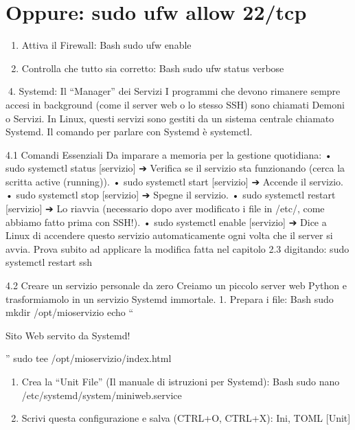 \documentclass[11pt,a4paper]{article}
\begin{document}
\section{Oppure: sudo ufw allow
22/tcp}\label{oppure-sudo-ufw-allow-22tcp}

\begin{enumerate}
\def\labelenumi{\arabic{enumi}.}
\setcounter{enumi}{2}
\item
  Attiva il Firewall: Bash sudo ufw enable
\item
  Controlla che tutto sia corretto: Bash sudo ufw status verbose
\end{enumerate}

4. Systemd: Il ``Manager'' dei Servizi I programmi che devono rimanere
sempre accesi in background (come il server web o lo stesso SSH) sono
chiamati Demoni o Servizi. In Linux, questi servizi sono gestiti da un
sistema centrale chiamato Systemd. Il comando per parlare con Systemd è
systemctl.

4.1 Comandi Essenziali Da imparare a memoria per la gestione quotidiana:
• sudo systemctl status {[}servizio{]} ➔ Verifica se il servizio sta
funzionando (cerca la scritta active (running)). • sudo systemctl start
{[}servizio{]} ➔ Accende il servizio. • sudo systemctl stop
{[}servizio{]} ➔ Spegne il servizio. • sudo systemctl restart
{[}servizio{]} ➔ Lo riavvia (necessario dopo aver modificato i file in
/etc/, come abbiamo fatto prima con SSH!). • sudo systemctl enable
{[}servizio{]} ➔ Dice a Linux di accendere questo servizio
automaticamente ogni volta che il server si avvia. Prova subito ad
applicare la modifica fatta nel capitolo 2.3 digitando: sudo systemctl
restart ssh

4.2 Creare un servizio personale da zero Creiamo un piccolo server web
Python e trasformiamolo in un servizio Systemd immortale. 1. Prepara i
file: Bash sudo mkdir /opt/mioservizio echo ``

Sito Web servito da Systemd!

'' \textbar{} sudo tee /opt/mioservizio/index.html

\begin{enumerate}
\def\labelenumi{\arabic{enumi}.}
\setcounter{enumi}{1}
\item
  Crea la ``Unit File'' (Il manuale di istruzioni per Systemd): Bash
  sudo nano /etc/systemd/system/miniweb.service
\item
  Scrivi questa configurazione e salva (CTRL+O, CTRL+X): Ini, TOML
  {[}Unit{]}
\end{enumerate}
\end{document}
